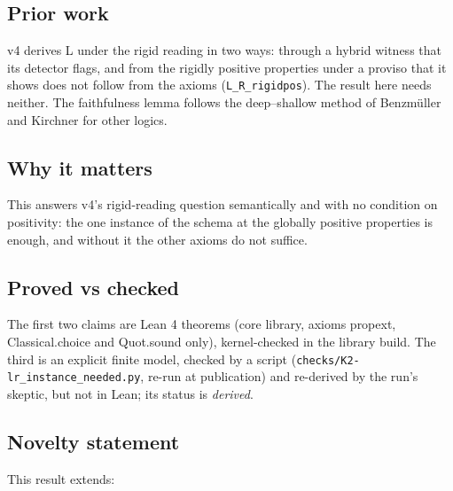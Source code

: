 \documentclass{article}
\begin{document}
\subsection*{Prior work}

v4 derives L under the rigid reading in two ways: through a hybrid witness that its detector
flags, and from the rigidly positive properties under a proviso that it shows does not follow
from the axioms (\texttt{L\_R\_rigidpos}). The result here needs neither. The faithfulness lemma follows
the deep--shallow method of Benzmüller and Kirchner for other logics.

\subsection*{Why it matters}

This answers v4's rigid-reading question semantically and with no condition on positivity: the
one instance of the schema at the globally positive properties is enough, and without it the
other axioms do not suffice.

\subsection*{Proved vs checked}

The first two claims are Lean 4 theorems (core library, axioms propext, Classical.choice and
Quot.sound only), kernel-checked in the library build. The third is an explicit finite model,
checked by a script (\texttt{checks/K2-lr\_instance\_needed.py}, re-run at publication) and re-derived by
the run's skeptic, but not in Lean; its status is \emph{derived}.

\subsection*{Novelty statement}

This result extends:
\end{document}
